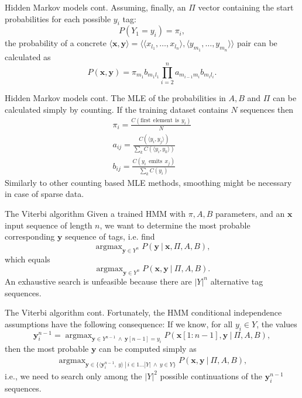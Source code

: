 \documentclass[style=upen, size=14pt]{powerdot}
\DeclareMathOperator*{\argmax}{argmax}
\theoremstyle{definition}
\begin{document}
  \begin{slide}[toc=]{Hidden Markov models cont.}
    Assuming, finally, an $\Pi$ vector containing the start probabilities
    for each possible $y_i$ tag:
    $$
    P(Y_1 = y_i) = \pi_i,
    $$
    the probability of a concrete
    $\langle \mathbf{x}, \mathbf{y} \rangle =\langle \langle
    x_{l_1},\dots,x_{l_n} \rangle, \langle y_{m_1},\dots,y_{m_n} \rangle
    \rangle$ pair can be calculated as
    $$
    P(\mathbf{x}, \mathbf{y}) = \pi_{m_1} b_{m_1 l_1}
    \prod_{i=2}^na_{m_{i-1} m_i}b_{m_i l_i}.
    $$
  \end{slide}

  \begin{slide}[toc=]{Hidden Markov models cont.} The MLE of the probabilities
    in $A, B$ and $\Pi$ can be calculated simply by counting. If the training
    dataset contains $N$ sequences then
    \begin{gather*} \pi_i = \frac{C(\mathrm{first~~element~~is~~}
        y_i)}{N}\\ a_{ij} = \frac{C(\langle y_i,y_j\rangle)}{\sum_kC(\langle
        y_i,y_k\rangle)}\\ b_{ij} = \frac{C(y_i \mathrm{~~emits~~} x_j)}{\sum_kC(y_i)}
    \end{gather*}
    Similarly to other counting based MLE methods, smoothing might be necessary
    in case of sparse data.
  \end{slide}

  \begin{slide}[toc=Viterbi]{The Viterbi algorithm}
    Given a trained HMM with $\pi, A, B$ parameters, and an $\mathbf{x}$
    input sequence of length $n$, we want to determine the most probable corresponding
    $\mathbf{y}$ sequence of tags, i.e. find
    $$
    \argmax_{\mathbf{y}\in Y^n} P(\mathbf{y} ~|~ \mathbf{x}, \Pi, A, B),
    $$
    which equals
    $$
    \argmax_{\mathbf{y}\in Y^n} P(\mathbf{x}, \mathbf{y} ~|~ \Pi, A, B).
    $$
    An exhaustive search is unfeasible because there are $|Y|^n$ alternative tag
    sequences.
  \end{slide}
  
  \begin{slide}[toc=]{The Viterbi algorithm cont.}
    Fortunately, the HMM conditional independence assumptions have the following
    consequence: If we know, for all $y_i\in Y$, the values
    $$
    \mathbf{y}^{n-1}_i = \argmax_{\mathbf{y}\in Y^{n-1}~\wedge~\mathbf{y}[n-1] = y_i}
    P(\mathbf{x}[1:n-1], \mathbf{y} ~|~ \Pi, A, B),
    $$
    then the most probable $\mathbf{y}$ can be computed simply as 
    \begin{gather*}
      \argmax_{\mathbf{y}\in \{\langle \mathbf{y}_i^{n-1},~y \rangle ~|~ i \in 1\dots |Y|~\wedge~ y \in Y\}} P(\mathbf{x}, \mathbf{y} ~|~ \Pi, A, B),
    \end{gather*}
    i.e., we need to search only among the $|Y|^2$ possible continuations of the
    $\mathbf{y}^{n-1}_i$ sequences.
  \end{slide}
\end{document}
